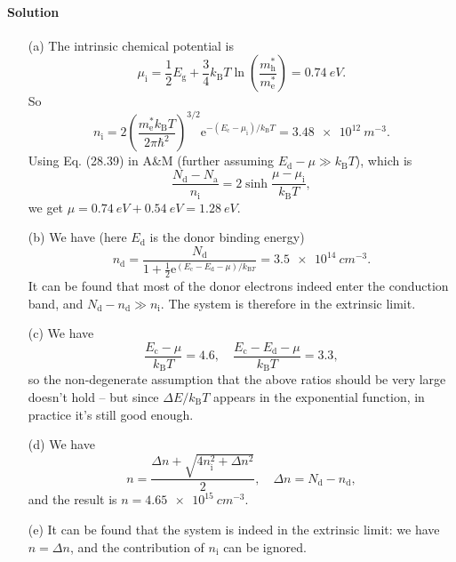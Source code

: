 \documentclass[hyperref, a4paper]{article}
\newcommand*{\ee}{\mathrm{e}}
\begin{document}
\paragraph{Solution} \begin{itemize}
\item[(a)] The intrinsic chemical potential is 
\begin{equation}
    \mu_{\text{i}} = \frac{1}{2} E_{\text{g}} + \frac{3}{4} k_{\text{B}} T \ln(\frac{m^*_{\text{h}} }{m^*_{\text{e}}}) = \SI{0.74}{eV}.
\end{equation}
So 
\begin{equation}
    n_{\text{i}} = 2 \left( \frac{m_\text{e}^* k_{\text{B}} T}{2 \pi \hbar^2} \right)^{3/2} 
    \ee^{- (E_{\text{c}} - \mu_{\text{i}}) / k_{\text{B}} T} 
    = \SI{3.48e12}{m^{-3}}.
\end{equation}
Using Eq. (28.39) in A\&M (further assuming $E_{\text{d}} - \mu \gg k_{\text{B}} T$), which is 
\begin{equation}
    \frac{N_\text{d} - N_\text{a}}{n_\text{i}} = 2 \sinh \frac{\mu - \mu_{\text{i}}}{k_{\text{B}} T},
    \label{eq:quick-mu}
\end{equation}
we get $\mu = \SI{0.74}{eV} + \SI{0.54}{eV} = \SI{1.28}{eV}$.

\item[(b)] We have (here $E_{\text{d}}$ is the donor binding energy)
\begin{equation}
    n_{\text{d}} = \frac{N_{\text{d}}}{1 + \frac{1}{2} \ee^{(E_{\text{c}} - E_{\text{d}} - \mu) / k_{\text{B} T}}}
    = \SI{3.5e14}{cm^{-3}}.
\end{equation}
It can be found that most of the donor electrons indeed enter the conduction band,
and $N_{\text{d}} - n_{\text{d}} \gg n_{\text{i}}$.
The system is therefore in the extrinsic limit.

\item[(c)] We have 
\[
    \frac{E_{\text{c}} - \mu}{k_{\text{B}} T} = 4.6, \quad 
    \frac{E_{\text{c}} - E_{\text{d}} - \mu}{k_{\text{B}} T} = 3.3,
\]
so the non-degenerate assumption that the above ratios should be very large 
doesn't hold -- but since $\Delta E / k_{\text{B}} T$ appears in the exponential function,
in practice it's still good enough.

\item[(d)] We have 
\begin{equation}
    n = \frac{\Delta n + \sqrt{ 4 n_{\text{i}}^2 + \Delta n^2 }}{2}, 
    \quad \Delta n = N_{\text{d}} - n_{\text{d}},
\end{equation}
and the result is $n = \SI{4.65e15}{cm^{-3}}$.

\item[(e)] It can be found that the system is indeed in the extrinsic limit:
we have $n = \Delta n$, 
and the contribution of $n_{\text{i}}$ can be ignored.

\end{itemize}
\end{document}
